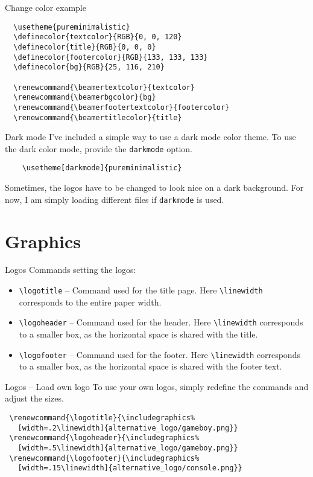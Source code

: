 \documentclass[aspectratio=169]{beamer}                    %
\begin{document}
\begin{frame}[fragile]{Change color example}
	\small
	\begin{verbatim}
  \usetheme{pureminimalistic}
  \definecolor{textcolor}{RGB}{0, 0, 120}
  \definecolor{title}{RGB}{0, 0, 0}
  \definecolor{footercolor}{RGB}{133, 133, 133}
  \definecolor{bg}{RGB}{25, 116, 210}

  \renewcommand{\beamertextcolor}{textcolor}
  \renewcommand{\beamerbgcolor}{bg}
  \renewcommand{\beamerfootertextcolor}{footercolor}
  \renewcommand{\beamertitlecolor}{title}
  \end{verbatim}
\end{frame}

\begin{frame}[fragile]{Dark mode}
	I've included a simple way to use a dark mode
	color theme. To use the dark color mode, provide the \texttt{darkmode}
	option.
	\begin{verbatim}
    \usetheme[darkmode]{pureminimalistic}
    \end{verbatim}
	Sometimes, the logos have to be changed to look nice on a
	dark background. For now, I am simply loading different
	files if \texttt{darkmode} is used.
\end{frame}

\section{Graphics}
\begin{frame}{Logos}
	Commands setting the logos:
	\begin{itemize}
		\item \texttt{\textbackslash{}logotitle} -- Command used for the title page.
		      Here \texttt{\textbackslash{}linewidth} corresponds to the entire paper width.
		\item \texttt{\textbackslash{}logoheader} -- Command used for the header.
		      Here \texttt{\textbackslash{}linewidth} corresponds to a smaller box,
		      as the horizontal space is shared with the title.
		\item \texttt{\textbackslash{}logofooter} -- Command used for the footer.
		      Here \texttt{\textbackslash{}linewidth} corresponds to a smaller box,
		      as the horizontal space is shared with the footer text.
	\end{itemize}
\end{frame}

\begin{frame}[fragile]{Logos -- Load own logo}
	To use your own logos, simply redefine the commands and adjust the sizes.
	\begin{verbatim}
 \renewcommand{\logotitle}{\includegraphics%
   [width=.2\linewidth]{alternative_logo/gameboy.png}}
 \renewcommand{\logoheader}{\includegraphics%
   [width=.5\linewidth]{alternative_logo/gameboy.png}}
 \renewcommand{\logofooter}{\includegraphics%
   [width=.15\linewidth]{alternative_logo/console.png}}
  \end{verbatim}
\end{frame}
\end{document}
